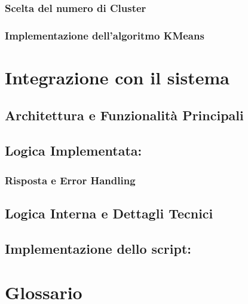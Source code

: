 \documentclass[a4paper,12pt]{article}
\begin{document}
\subsubsection{Scelta del numero di Cluster}
\subsubsection{Implementazione dell'algoritmo KMeans}
\section{Integrazione con il sistema}
\subsection{Architettura e Funzionalità Principali}
\subsection{Logica Implementata: }
\subsubsection{Risposta e Error Handling}
\subsection{Logica Interna e Dettagli Tecnici}
\subsection{Implementazione dello script: }
\section{Glossario}
\end{document}
